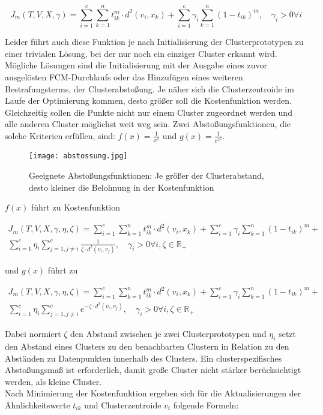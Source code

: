 \documentclass[11pt,ceqn]{book}
\begin{document}
$$J_m(T,V,X,\gamma) = \sum_{i=1}^{c} \sum_{k=1}^{n} t_{ik}^m \cdot d^2(v_i,x_k) + \sum_{i=1}^c  \gamma_i \sum_{k=1}^n (1-t_{ik})^m,\quad \gamma_i>0 \forall i$$

Leider führt auch diese Funktion je nach Initialisierung der Clusterprototypen zu einer trivialen Lösung, bei der nur noch ein einziger Cluster erkannt wird. Mögliche Lösungen sind die Initialisierung mit der Ausgabe eines zuvor ausgelösten FCM-Durchlaufs oder das Hinzufügen eines weiteren Bestrafungsterms, der Clusterabstoßung. Je näher sich die Clusterzentroide im Laufe der Optimierung kommen, desto größer soll die Kostenfunktion werden. Gleichzeitig sollen die Punkte nicht nur einem Cluster zugeordnet werden und alle anderen Cluster möglichst weit weg sein. Zwei Abstoßungsfunktionen\cite{cabstossung}, die solche Kriterien erfüllen, sind: $f(x) = \frac{1}{x^2}$ und $g(x) = \frac{1}{e^{x^2}}$.

\begin{figure}[H]
\centering
\texttt{[image: abstossung.jpg]}
 \caption{Geeignete Abstoßungsfunktionen: Je größer der Clusterabstand, desto kleiner die Belohnung in der Kostenfunktion}
\end{figure}

$f(x)$ führt zu Kostenfunktion

\begin{equation}
\begin{split}
J_m(T,V,X,\gamma,\eta,\zeta) = \sum_{i=1}^{c} \sum_{k=1}^{n} t_{ik}^m \cdot d^2(v_i,x_k) + \sum_{i=1}^c  \gamma_i \sum_{k=1}^n (1-t_{ik})^m + \\ \sum_{i=1}^c \eta_i \sum_{j=1,j\neq i}^c \frac{1}{\zeta\cdot d^2(v_i,v_j)},\quad \gamma_i>0 \forall i, \zeta\in \mathbb{R_+}
\end{split}
\end{equation}

und $g(x)$ führt zu 

\begin{equation}
\begin{split}
J_m(T,V,X,\gamma,\eta,\zeta) = \sum_{i=1}^{c} \sum_{k=1}^{n} t_{ik}^m \cdot d^2(v_i,x_k) + \sum_{i=1}^c  \gamma_i \sum_{k=1}^n (1-t_{ik})^m + \\ \sum_{i=1}^c \eta_i \sum_{j=1,j\neq i}^c e^{-\zeta\cdot d^2(v_i,v_j)},\quad \gamma_i>0 \forall i, \zeta\in \mathbb{R_+}
\end{split}
\end{equation}

Dabei normiert $\zeta$ den Abstand zwischen je zwei Clusterprototypen und $\eta_i$ setzt den Abstand eines Clusters zu den benachbarten Clustern in Relation zu den Abständen zu Datenpunkten innerhalb des Clusters. Ein clusterspezifisches Abstoßungsmaß ist erforderlich, damit große Cluster nicht stärker berücksichtigt werden, als kleine Cluster.
\\
Nach Minimierung der Kostenfunktion ergeben sich für die Aktualisierungen der Ähnlichkeitswerte $t_{ik}$ und Clusterzentroide $v_i$ folgende Formeln:
\end{document}
